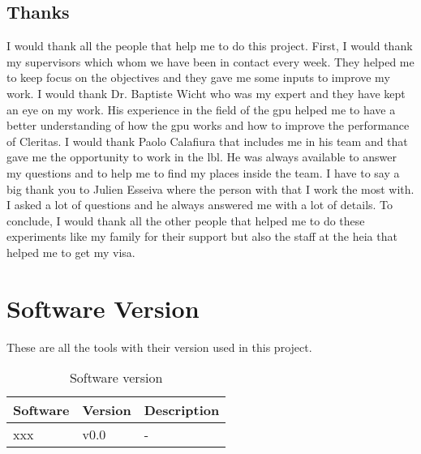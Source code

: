 \section{Thanks}
\label{ch:acknowledgements:thanks}

I would thank all the people that help me to do this project.
First, I would thank my supervisors which whom we have been in contact every week.
They helped me to keep focus on the objectives and they gave me some inputs to
improve my work.
I would thank Dr. Baptiste Wicht who was my expert and they have kept an eye
on my work.
His experience in the field of the \acrshort{gpu} helped me to have a better
understanding of how the \acrshort{gpu} works and how to improve the performance
of Cleritas.
I would thank Paolo Calafiura that includes me in his team and that gave me the
opportunity to work in the \acrshort{lbl}.
He was always available to answer my questions and to help me to find my places
inside the team.
I have to say a big thank you to Julien Esseiva where the person with that I work
the most with.
I asked a lot of questions and he always answered me with a lot of details.
To conclude, I would thank all the other people that helped me to do these
experiments like my family for their support but also the staff at the \acrshort{heia}
that helped me to get my visa.

\chapter{Software Version}
\label{ch:software}
These are all the tools with their version used in this project.

\begin{table}[ht]
    \centering
    \begin{tabular}{|l|p{3cm}|l|}
    \hline
    \multicolumn{1}{|c|}{\textbf{Software}} & \multicolumn{1}{c|}{\textbf{Version}} & \multicolumn{1}{c|}{\textbf{Description}} \\ \hline
    xxx                     & v0.0                                  & -        \\ \hline
    \end{tabular}
    \caption{Software version}
    \label{tab:softwareVersion}
\end{table}